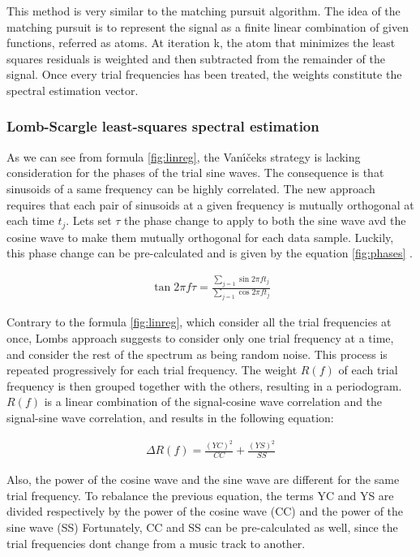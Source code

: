 \documentclass[letterpaper]{article}
\begin{document}
This method is very similar to the matching pursuit algorithm. The idea of the matching pursuit is to represent the signal as a finite linear combination of given
functions, referred as atoms. At iteration k, the atom that minimizes the least squares residuals is weighted and then subtracted from 
the remainder of the signal. Once every trial frequencies has been treated, the weights constitute the spectral estimation vector.

\subsubsection{Lomb-Scargle least-squares spectral estimation}

As we can see from formula \ref{fig:linreg}, the Van\'{\i}\v{c}ek\textquotesingle s strategy is lacking consideration for the phases of the trial sine waves.
The consequence is that sinusoids of a same frequency can be highly correlated. The new approach requires that each pair of sinusoids at a given frequency
is mutually orthogonal at each time $t_{j}$. Let\textquotesingle s set $\tau$ the phase change to apply to both the sine wave avd the cosine wave to make
them mutually orthogonal for each data sample. Luckily, this phase change can be pre-calculated and is given by the equation \ref{fig:phases} \citep{LS}.

\begin{align}
\tan 2\pi f \tau = \frac{\sum\limits_{j=1} \sin 2\pi f t_{j}}{\sum\limits_{j=1} \cos 2\pi f t_{j}}
\label{fig:phases}
\end{align}

Contrary to the formula \ref{fig:linreg}, which consider all the trial frequencies at once, Lomb\textquotesingle s approach suggests to consider only one
trial frequency at a time, and consider the rest of the spectrum as being random noise. This process is repeated progressively for each trial frequency. The weight $R(f)$ of each trial frequency is then grouped together with the others, resulting in a periodogram. $R(f)$ is a linear combination of
the signal-cosine wave correlation and the signal-sine wave correlation, and results in the following equation:

\begin{align}
\Delta R(f) = \frac{(YC)^{2}}{CC} 
+ \frac{(YS)^{2}}{SS}
\label{fig:ccss}
\end{align}

Also, the power of the cosine wave and the sine wave are different for the same trial frequency. To rebalance the previous equation, the terms YC and YS
are divided respectively by the power of the cosine wave (CC) and the power of the sine wave (SS)
Fortunately, CC and SS can be pre-calculated as well, since the trial frequencies don\textquotesingle t change from a music track to another.
\end{document}
